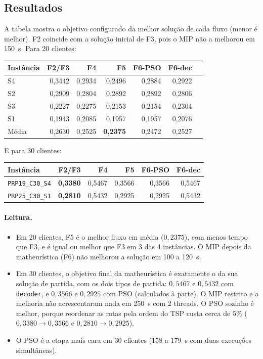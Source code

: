 \documentclass[11pt,a4paper]{article}
\begin{document}
\subsection{Resultados}

A tabela mostra o objetivo configurado da melhor solução de cada fluxo (menor
é melhor). F2 coincide com a solução inicial de F3, pois o MIP não a melhorou
em 150~s. Para 20 clientes:

\begin{center}
\small
\begin{tabular}{lrrrrrr}
\toprule
Instância & F2/F3 & F4 & F5 & F6-PSO & F6-dec \\
\midrule
S4 & 0,3442 & 0,2934 & 0,2496 & 0,2884 & 0,2922 \\
S2 & 0,2909 & 0,2804 & 0,2892 & 0,2892 & 0,2806 \\
S3 & 0,2227 & 0,2275 & 0,2153 & 0,2154 & 0,2304 \\
S1 & 0,1943 & 0,2085 & 0,1957 & 0,1957 & 0,2076 \\
\midrule
Média & 0,2630 & 0,2525 & \textbf{0,2375} & 0,2472 & 0,2527 \\
\bottomrule
\end{tabular}
\end{center}

E para 30 clientes:

\begin{center}
\small
\begin{tabular}{lrrrrr}
\toprule
Instância & F2/F3 & F4 & F5 & F6-PSO & F6-dec \\
\midrule
\texttt{PRP19\_C30\_S4} & \textbf{0,3380} & 0,5467 & 0,3566 & 0,3566 & 0,5467 \\
\texttt{PRP25\_C30\_S1} & \textbf{0,2810} & 0,5432 & 0,2925 & 0,2925 & 0,5432 \\
\bottomrule
\end{tabular}
\end{center}

\paragraph{Leitura.}
\begin{itemize}[leftmargin=1.8em]
  \item Em 20 clientes, F5 é o melhor fluxo em média ($0{,}2375$), com menos
  tempo que F3, e é igual ou melhor que F3 em 3 das 4 instâncias. O MIP depois
  da matheurística (F6) não melhorou a solução em 100 a 120~s.
  \item Em 30 clientes, o objetivo final da matheurística é exatamente o da sua
  solução de partida, com os dois tipos de partida: $0{,}5467$ e $0{,}5432$ com
  \texttt{decoder}, e $0{,}3566$ e $0{,}2925$ com PSO (calculados à parte). O MIP
  restrito e a melhoria não acrescentaram nada em 250~s com 2 threads. O PSO
  sozinho é melhor, porque reordenar as rotas pela ordem do TSP custa cerca de
  $5\%$ ($0{,}3380\to0{,}3566$ e $0{,}2810\to0{,}2925$).
  \item O PSO é a etapa mais cara em 30 clientes ($158$ a $179$~s com duas
  execuções simultâneas).
\end{itemize}
\end{document}
